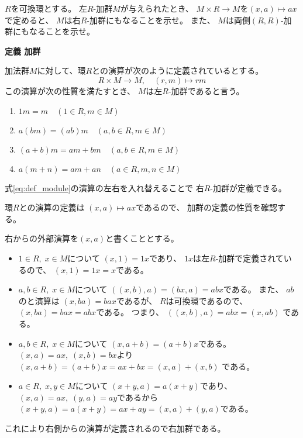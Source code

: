 \documentclass[12pt,b5paper]{ltjsarticle}
\begin{document}
\hrulefill

$R$を可換環とする。
左$R$-加群$M$が与えられたとき、
$M \times R \to M$を$(x,a) \mapsto ax$で定めると、
$M$は右$R$-加群にもなることを示せ。
また、
$M$は両側$(R,R)$-加群にもなることを示せ。


\dotfill


\textbf{定義 加群}

加法群$M$に対して、環$R$との演算が次のように定義されているとする。
\begin{equation}\label{eq:def_module}
 R \times M \to M, \quad (r,m) \mapsto rm
\end{equation}
この演算が次の性質を満たすとき、
$M$は左$R$-加群であると言う。
\begin{enumerate}
 \item $1m=m \quad (1\in R, m\in M)$
 \item $a(bm)=(ab)m \quad (a,b\in R, m\in M)$
 \item $(a+b)m=am+bm \quad (a,b\in R, m\in M)$
 \item $a(m+n)=am+an \quad (a\in R, m,n\in M)$
\end{enumerate}

式\eqref{eq:def_module}の演算の左右を入れ替えることで
右$R$-加群が定義できる。


\dotfill

環$R$との演算の定義は
$(x,a) \mapsto ax$であるので、
加群の定義の性質を確認する。

右からの外部演算を$(x,a)$と書くこととする。
\begin{itemize}
 \item
      $1\in R,\; x\in M$について
      $(x,1) = 1x$であり、
      $1x$は左$R$-加群で定義されているので、
      $(x,1)=1x=x$である。
 \item
      $a,b \in R, \; x\in M$について
      $((x,b),a)=(bx,a)=abx$である。
      また、
      $ab$のと演算は
      $(x,ba)=bax$であるが、
      $R$は可換環であるので、
      $(x,ba)=bax=abx$である。
      つまり、
      $((x,b),a)=abx=(x,ab)$
      である。
 \item
      $a,b \in R, \; x\in M$について
      $(x, a+b)=(a+b)x$である。
      $(x,a)=ax,\; (x,b)=bx$より
      $(x, a+b)=(a+b)x=ax+bx=(x,a)+(x,b)$
      である。
 \item
      $a \in R, \; x,y\in M$について
      $(x+y, a)=a(x+y)$であり、
      $(x,a)=ax,\;(y,a)=ay$であるから
      $(x+y, a)=a(x+y)=ax+ay=(x,a)+(y,a)$である。
\end{itemize}

これにより右側からの演算が定義されるので右加群である。
\end{document}
